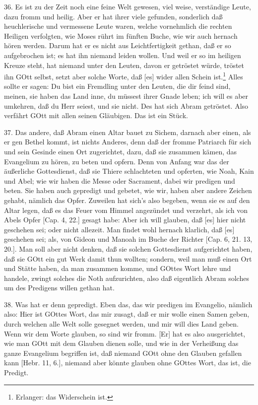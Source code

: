 36. Es ist zu der Zeit noch eine feine Welt gewesen, viel weise, verständige Leute, dazu fromm und heilig. Aber er hat ihrer viele gefunden, sonderlich daß heuchlerische und vermessene Leute waren, welche vornehmlich die rechten Heiligen verfolgten, wie Moses rührt im fünften Buche, wie wir auch hernach hören werden. Darum hat er es nicht aus Leichtfertigkeit gethan, daß er so aufgebrochen ist; es hat ihn niemand leiden wollen. Und weil er so im heiligen Kreuze steht, hat niemand unter den Leuten, davon er getröstet würde, tröstet ihn GOtt selbst, setzt aber solche Worte, daß [es] wider allen Schein ist.\footnote{Erlanger: das Widerschein ist.} Alles sollte er sagen: Du bist ein Fremdling unter den Leuten, die dir feind sind, meinen, sie haben das Land inne, du müssest ihrer Gnade leben; ich will es aber umkehren, daß du Herr seiest, und sie nicht. Des hat sich Abram getröstet. Also verfährt GOtt mit allen seinen Gläubigen. Das ist ein Stück.

37. Das andere, daß Abram einen Altar bauet zu Sichem, darnach aber einen, als er gen Bethel kommt, ist nichts Anderes, denn daß der fromme Patriarch für sich und sein Gesinde einen Ort zugerichtet, dazu, daß sie zusammen kämen, das Evangelium zu hören, zu beten und opfern. Denn von Anfang war das der äußerliche Gottesdienst, daß sie Thiere schlachteten und opferten, wie Noah, Kain und Abel; wie wir haben die Messe oder Sacrament, dabei wir predigen und beten. Sie haben auch gepredigt und gebetet, wie wir, haben aber andere Zeichen gehabt, nämlich das Opfer. Zuweilen hat sich’s also begeben, wenn sie es auf den Altar legen, daß es das Feuer vom Himmel angezündet und verzehrt, als ich von Abels Opfer [Cap. 4, 22.] gesagt habe: Aber ich will glauben, daß [es] hier nicht geschehen sei; oder nicht allezeit. Man findet wohl hernach klarlich, daß [es] geschehen sei; als, von Gideon und Manoah im Buche der Richter [Cap. 6, 21. 13, 20.]. Man soll aber nicht denken, daß sie solchen Gottesdienst aufgerichtet haben, daß sie GOtt ein gut Werk damit thun wollten; sondern, weil man muß einen Ort und Stätte haben, da man zusammen komme, und GOttes Wort lehre und handele, zwingt solches die Noth aufzurichten, also daß eigentlich Abram solches um des Predigens willen gethan hat.

38. Was hat er denn gepredigt. Eben das, das wir predigen im Evangelio, nämlich also: Hier ist GOttes Wort, das mir zusagt, daß er mir wolle einen Samen geben, durch welchen alle Welt solle gesegnet werden, und mir will dies Land geben. Wenn wir dem Worte glauben, so sind wir fromm. [Er] hat es also ausgerichtet, wie man GOtt mit dem Glauben dienen solle, und wie in der Verheißung das ganze Evangelium begriffen ist, daß niemand GOtt ohne den Glauben gefallen kann [Hebr. 11, 6.], niemand aber könnte glauben ohne GOttes Wort, das ist, die Predigt.

